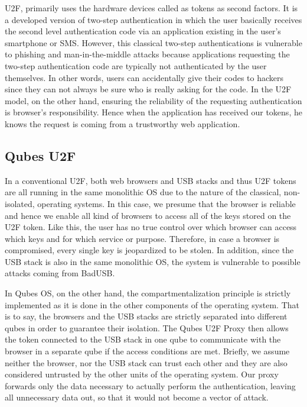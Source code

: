 \documentclass[runningheads,a4paper]{article}
\begin{document}
U2F, primarily uses the hardware devices called as tokens as second
factors. It is a developed version of two-step authentication in which
the user basically receives the second level authentication code via
an application existing in the user's smartphone or SMS. However, this
classical two-step authentications is vulnerable to phishing and
man-in-the-middle attacks because applications requesting the two-step
authentication code are typically not authenticated by the
user themselves. In other words, users can accidentally give their codes to
hackers since they can not always be sure who is really asking for the
code. In the U2F model, on the other hand, ensuring the reliability of
the requesting authentication is browser's responsibility. Hence
when the application has received our tokens, he knows the request is
coming from a trustworthy web application.

\subsection{Qubes U2F} 

In a conventional U2F, both web browsers and
USB stacks and thus U2F tokens are all running in the same monolithic
OS due to the nature of the classical, non-isolated, operating
systems. In this case, we presume that the browser is reliable and
hence we enable all kind of browsers to access all of the keys stored
on the U2F token. Like this, the user has no true control over which
browser can access which keys and for which service or
purpose. Therefore, in case a browser is compromised, every single key
is jeopardized to be stolen. In addition, since the USB stack is also
in the same monolithic OS, the system is vulnerable to possible
attacks coming from BadUSB.

In Qubes OS, on the other hand, the
compartmentalization principle is strictly implemented as it is done in the other components of the operating system. That is to
say, the browsers and the USB stacks are strictly separated into
different qubes in order to guarantee their isolation.  The Qubes U2F
Proxy then allows the token connected to the USB stack in one qube to
communicate with the browser in a separate qube if the access
conditions are met. Briefly, we assume neither the browser, nor the USB
stack can trust each other and they are also considered untrusted by the other units of the operating system. Our
proxy forwards only the data necessary to actually perform the
authentication, leaving all unnecessary data out, so that it would not
become a vector of attack.
\end{document}
